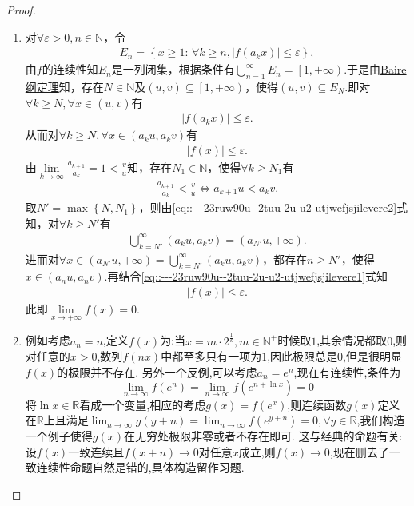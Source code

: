 \documentclass[../../main.tex]{subfiles}%
\begin{document}
\begin{proof}
\begin{enumerate}
\item 对$\forall \varepsilon >0,n\in \mathbb{N}$，令
\begin{align*}
E_n=\left\{ x\geqslant 1:\,\forall k\geqslant n,\left| f\left( a_kx \right) \right|\leqslant \varepsilon \right\},
\end{align*}
由$f$的连续性知$E_n$是一列闭集，根据条件有$\bigcup\limits_{n=1}^{\infty}{E_n}=\left[ 1,+\infty \right).$于是由\hyperref[theorem:Baire纲定理]{Baire纲定理}知，存在$N\in \mathbb{N}$及$\left( u,v \right) \subseteq \left[ 1,+\infty \right)$，使得$\left( u,v \right) \subseteq E_N.$即对$\forall k\geqslant N,\forall x\in \left( u,v \right)$有
\begin{align*}
\left| f\left( a_kx \right) \right|\leqslant \varepsilon.
\end{align*}
从而对$\forall k\geqslant N,\forall x\in \left( a_ku,a_kv \right)$有
\begin{align}
\left| f\left( x \right) \right|\leqslant \varepsilon. \label{eq::---23ruw90u--2tuu-2u-u2-utjwefjsjilevere1}
\end{align}
由$\lim\limits_{k\rightarrow \infty}\frac{a_{k+1}}{a_k}=1<\frac{v}{u}$知，存在$N_1\in \mathbb{N}$，使得$\forall k\geqslant N_1$有
\begin{align}
\frac{a_{k+1}}{a_k}<\frac{v}{u}\Longleftrightarrow a_{k+1}u<a_kv. \label{eq::---23ruw90u--2tuu-2u-u2-utjwefjsjilevere2}
\end{align}
取$N' =\max \left\{ N,N_1 \right\}$，则由\eqref{eq::---23ruw90u--2tuu-2u-u2-utjwefjsjilevere2}式知，对$\forall k\geqslant N'$有
\begin{align*}
\bigcup\limits_{k=N'}^{\infty}{\left( a_ku,a_kv \right)}=\left( a_{N'}u,+\infty \right).
\end{align*}
进而对$\forall x\in \left( a_{N'}u,+\infty \right) =\bigcup\limits_{k=N'}^{\infty}{\left( a_ku,a_kv \right)}$，都存在$n\geqslant N'$，使得$x\in \left( a_nu,a_nv \right).$再结合\eqref{eq::---23ruw90u--2tuu-2u-u2-utjwefjsjilevere1}式知
\begin{align*}
\left| f\left( x \right) \right|\leqslant \varepsilon.
\end{align*}
此即$\lim\limits_{x\rightarrow +\infty}f\left( x \right) =0.$

\item 例如考虑\(a_n = n\),定义\(f(x)\)为:当\(x = m\cdot2^{\frac{1}{k}},m\in\mathbb{N}^+\)时候取\(1\),其余情况都取\(0\),则对任意的\(x > 0\),数列\(f(nx)\)中都至多只有一项为\(1\),因此极限总是\(0\),但是很明显\(f(x)\)的极限并不存在.
另外一个反例,可以考虑\(a_n = e^n\),现在有连续性,条件为
\[
\lim_{n\to\infty}f(e^n)=\lim_{n\to\infty}f(e^{n+\ln x}) = 0
\]
将\(\ln x\in\mathbb{R}\)看成一个变量,相应的考虑\(g(x)=f(e^x)\),则连续函数\(g(x)\)定义在\(\mathbb{R}\)上且满足\(\lim_{n\to\infty}g(y + n)=\lim_{n\to\infty}f(e^{y + n}) = 0,\forall y\in\mathbb{R}\),我们构造一个例子使得\(g(x)\)在无穷处极限非零或者不存在即可.
这与经典的命题有关:设\(f(x)\)一致连续且\(f(x + n)\to0\)对任意\(x\)成立,则\(f(x)\to0\),现在删去了一致连续性命题自然是错的,具体构造留作习题.
\end{enumerate}
\end{proof}
\end{document}
